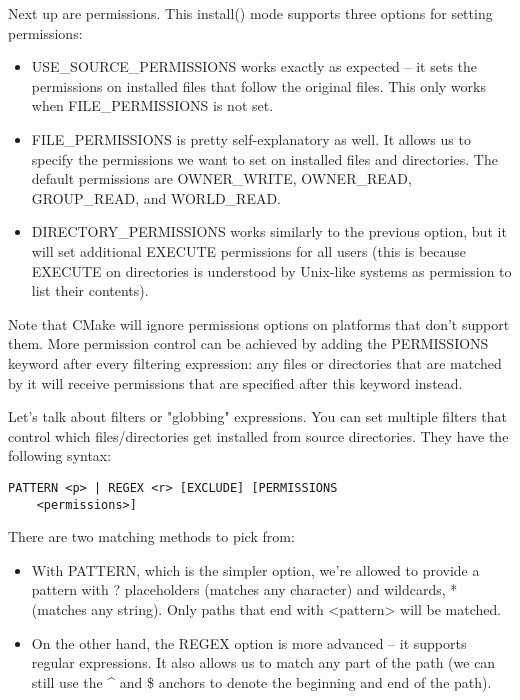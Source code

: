 Next up are permissions. This install() mode supports three options for setting permissions:

\begin{itemize}
\item 
USE\_SOURCE\_PERMISSIONS works exactly as expected – it sets the permissions on installed files that follow the original files. This only works when FILE\_PERMISSIONS is not set.

\item 
FILE\_PERMISSIONS is pretty self-explanatory as well. It allows us to specify the permissions we want to set on installed files and directories. The default permissions are OWNER\_WRITE, OWNER\_READ, GROUP\_READ, and WORLD\_READ.

\item 
DIRECTORY\_PERMISSIONS works similarly to the previous option, but it will set additional EXECUTE permissions for all users (this is because EXECUTE on directories is understood by Unix-like systems as permission to list their contents).
\end{itemize}

Note that CMake will ignore permissions options on platforms that don't support them. More permission control can be achieved by adding the PERMISSIONS keyword after every filtering expression: any files or directories that are matched by it will receive permissions that are specified after this keyword instead.

Let's talk about filters or "globbing" expressions. You can set multiple filters that control which files/directories get installed from source directories. They have the following syntax:

\begin{lstlisting}[style=styleCMake]
PATTERN <p> | REGEX <r> [EXCLUDE] [PERMISSIONS
	<permissions>]
\end{lstlisting}

There are two matching methods to pick from:

\begin{itemize}
\item 
With PATTERN, which is the simpler option, we're allowed to provide a pattern with ? placeholders (matches any character) and wildcards, * (matches any string). Only paths that end with <pattern> will be matched.

\item 
On the other hand, the REGEX option is more advanced – it supports regular expressions. It also allows us to match any part of the path (we can still use the \^{} and \$ anchors to denote the beginning and end of the path).
\end{itemize}

